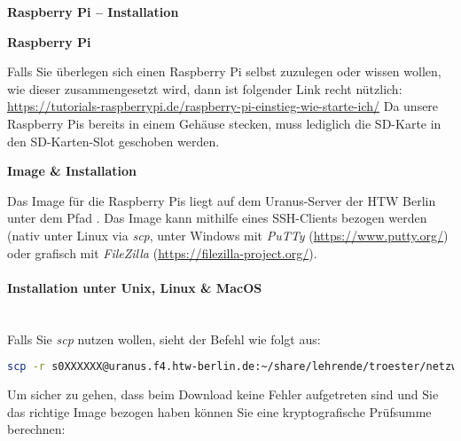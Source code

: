 \documentclass[paper=a4,fontsize=11pt]{scrartcl}%
\numberwithin{equation}{section}
\begin{document}
\begin{center}
\Large{\textbf{Raspberry Pi -- Installation}}
\end{center}
\begin{center}\Large{\textbf{Raspberry Pi}}\end{center}\vskip0.25in
Falls Sie überlegen sich einen Raspberry Pi selbst zuzulegen oder wissen wollen, wie dieser zusammengesetzt wird, dann ist folgender Link recht nützlich:\\
\url{https://tutorials-raspberrypi.de/raspberry-pi-einstieg-wie-starte-ich/}
Da unsere Raspberry Pis bereits in einem Gehäuse stecken, muss lediglich die SD-Karte in den SD-Karten-Slot geschoben werden.
\begin{center}\Large{\textbf{Image \& Installation}}\end{center}\vskip0.25in
Das Image für die Raspberry Pis liegt auf dem Uranus-Server der HTW Berlin unter dem Pfad . Das Image kann mithilfe eines SSH-Clients bezogen werden (nativ unter Linux via \emph{scp}, unter Windows mit \emph{PuTTy} (\url{https://www.putty.org/}) oder grafisch mit \emph{FileZilla} (\url{https://filezilla-project.org/}).
\paragraph{Installation unter Unix, Linux \& MacOS}~\\
Falls Sie \emph{scp} nutzen wollen, sieht der Befehl wie folgt aus:
\begin{lstlisting}[style=Bash, language=Bash]
scp -r s0XXXXXX@uranus.f4.htw-berlin.de:~/share/lehrende/troester/netzwerke/rpi/ ~/
		\end{lstlisting}
Um sicher zu gehen, dass beim Download keine Fehler aufgetreten sind und Sie das richtige Image bezogen haben können Sie eine kryptografische Prüfsumme berechnen:
\end{document}
